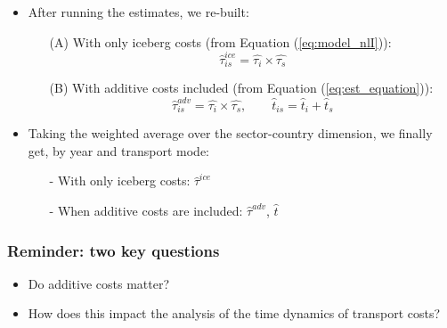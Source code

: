 \documentclass[10 pt,Helvetica, french]{beamer}
\begin{document}
\begin{frame}
\begin{itemize}
\item After running the estimates, we re-built: \vspace{0.1cm}
\begin{itemize}
\item[(A)] With only iceberg costs (from Equation (\ref{eq:model_nlI})):
$$\widehat{\tau}^{ice}_{is} = \widehat{\tau_{i}} \times \widehat{\tau_{s}}$$
\item[(B)] With additive costs included (from Equation (\ref{eq:est_equation})):
$$\widehat{\tau}^{adv}_{is} = \widehat{\tau_{i}} \times \widehat{\tau_{s}}, \qquad \widehat{t}_{is} = \widehat{t}_{i} + \widehat{t}_{s}$$
\end{itemize}
\pause
\item  Taking the weighted average over the sector-country dimension, we finally get, by year and transport mode: \vspace{0.1cm}
\begin{itemize}
\item[-] With only iceberg costs: $\widehat{\tau}^{ice}$ \vspace{0.1cm}
\item[-] When additive costs are included: $\widehat{\tau}^{adv}$, $\widehat{t}$

\end{itemize}
\end{itemize}
\end{frame}


\begin{frame}
\frametitle{Reminder: two key questions}
\begin{itemize}
\item Do additive costs matter? \vspace{0.5cm}
\item How does this impact the analysis of the time dynamics of transport costs?
\end{itemize}
\end{frame}

\end{document}

